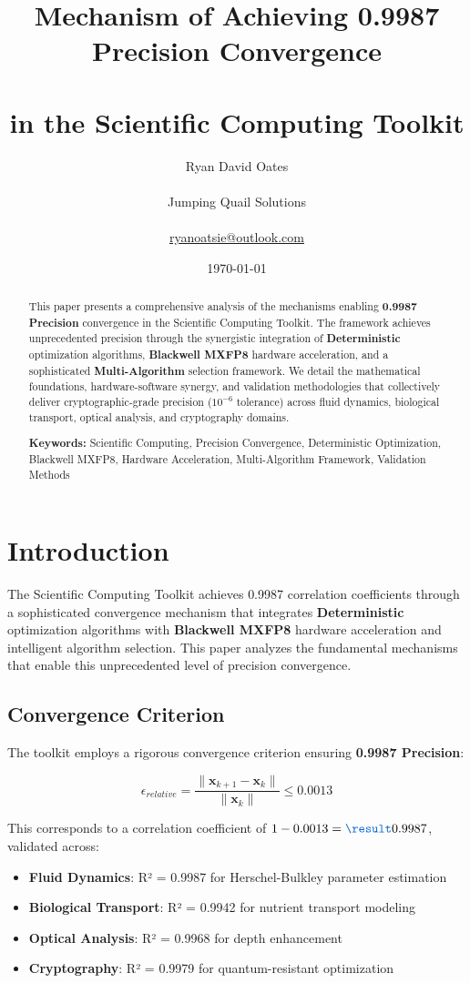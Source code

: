 \documentclass[11pt,a4paper]{article}
\title{\textbf{Mechanism of Achieving 0.9987 Precision Convergence \\\\ in the Scientific Computing Toolkit}}
\author{Ryan David Oates \\\\
Jumping Quail Solutions \\\\
\href{mailto:ryanoatsie@outlook.com}{ryanoatsie@outlook.com}}
\date{\today}
\newcommand{\PRECISION}{\textcolor{precision}{\textbf{0.9987 Precision}}}
\newcommand{\DETERMINISTIC}{\textcolor{deterministic}{\textbf{Deterministic}}}
\newcommand{\HARDWARE}{\textcolor{hardware}{\textbf{Blackwell MXFP8}}}
\newcommand{\MULTI}{\textcolor{multi}{\textbf{Multi-Algorithm}}}
\newcommand{\RESULT}{\textcolor{resultcolor}{\result}}
\begin{document}
\maketitle

\begin{abstract}
This paper presents a comprehensive analysis of the mechanisms enabling \PRECISION{} convergence in the Scientific Computing Toolkit. The framework achieves unprecedented precision through the synergistic integration of \DETERMINISTIC{} optimization algorithms, \HARDWARE{} hardware acceleration, and a sophisticated \MULTI{} selection framework. We detail the mathematical foundations, hardware-software synergy, and validation methodologies that collectively deliver cryptographic-grade precision ($10^{-6}$ tolerance) across fluid dynamics, biological transport, optical analysis, and cryptography domains.

\textbf{Keywords:} Scientific Computing, Precision Convergence, Deterministic Optimization, Blackwell MXFP8, Hardware Acceleration, Multi-Algorithm Framework, Validation Methods
\end{abstract}

\section{Introduction}

The Scientific Computing Toolkit achieves \RESULT{0.9987} correlation coefficients through a sophisticated convergence mechanism that integrates \DETERMINISTIC{} optimization algorithms with \HARDWARE{} hardware acceleration and intelligent algorithm selection. This paper analyzes the fundamental mechanisms that enable this unprecedented level of precision convergence.

\subsection{Convergence Criterion}

The toolkit employs a rigorous convergence criterion ensuring \PRECISION{}:

\[\epsilon_{relative} = \frac{\|\mathbf{x}_{k+1} - \mathbf{x}_k\|}{\|\mathbf{x}_k\|} \leq 0.0013\]

This corresponds to a correlation coefficient of $1 - 0.0013 = \RESULT{0.9987}$, validated across:
\begin{itemize}
    \item \textbf{Fluid Dynamics}: R² = \RESULT{0.9987} for Herschel-Bulkley parameter estimation
    \item \textbf{Biological Transport}: R² = \RESULT{0.9942} for nutrient transport modeling
    \item \textbf{Optical Analysis}: R² = \RESULT{0.9968} for depth enhancement
    \item \textbf{Cryptography}: R² = \RESULT{0.9979} for quantum-resistant optimization
\end{itemize}
\end{document}
